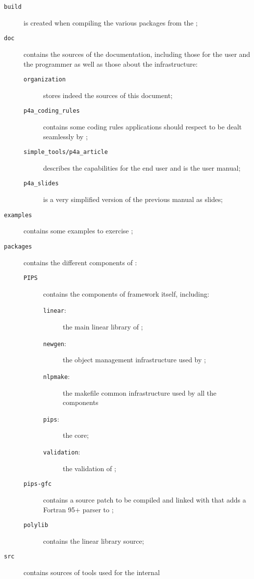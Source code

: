 \documentclass[a4paper]{article}
\begin{document}
\begin{description}
\item[\texttt{build}] is created when compiling the various
  \Apfa packages from the \Aautotools;
\item[\texttt{doc}] contains the sources of the \Apfa documentation,
  including those for the user and the programmer as well as those
  about the infrastructure:
  \begin{description}
  \item[\texttt{organization}] stores indeed the sources of this document;
  \item[\texttt{p4a\_coding\_rules}] contains some coding rules
    applications should respect to be dealt seamlessly by \Apfa;
  \item[\texttt{simple\_tools/p4a\_article}] describes the \Apfa
    capabilities for the end user and is the user manual;
  \item[\texttt{p4a\_slides}] is a very simplified version of the previous
    manual as slides;
  \end{description}
\item[\texttt{examples}] contains some examples to exercise \Apfa;
\item[\texttt{packages}] contains the different components of \Apfa:
  \begin{description}
  \item[\texttt{PIPS}] contains the components of \Apips framework
    itself, including:
    \begin{description}
    \item[\texttt{linear}:] the main linear library of \Apips;
    \item[\texttt{newgen}:] the object management infrastructure used by
      \Apips;
    \item[\texttt{nlpmake}:] the makefile common infrastructure used by
      all the \Apips components
    \item[\texttt{pips}:] the \Apips core;
    \item[\texttt{validation}:] the validation of \Apips;
    \end{description}
  \item[\texttt{pips-gfc}] contains a  source patch to be
    compiled and linked with \Apips that adds a Fortran 95+ parser to \Apips;
  \item[\texttt{polylib}] contains the \Apolylib linear library source;
  \end{description}
\item[\texttt{src}] contains sources of tools used for the internal

\end{description}
\end{document}
